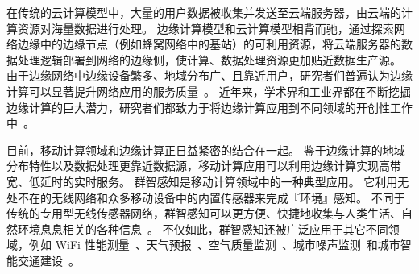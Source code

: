 在传统的云计算模型中，大量的用户数据被收集并发送至云端服务器，由云端的计算资源对海量数据进行处理。
边缘计算模型和云计算模型相背而驰，通过探索网络边缘中的边缘节点（例如蜂窝网络中的基站）的可利用资源，将云端服务器的数据处理逻辑部署到网络的边缘侧，使计算、数据处理资源更加贴近数据生产源。
由于边缘网络中边缘设备繁多、地域分布广、且靠近用户，研究者们普遍认为边缘计算可以显著提升网络应用的服务质量~\cite{DBLP:conf/sigcomm/BonomiMZA12}。
近年来，学术界和工业界都在不断挖掘边缘计算的巨大潜力，研究者们都致力于将边缘计算应用到不同领域的开创性工作中~\cite{DBLP:journals/access/MarjanovicAZ18,DBLP:journals/iotj/ChiangZ16}。


目前，移动计算领域和边缘计算正日益紧密的结合在一起。
鉴于边缘计算的地域分布特性以及数据处理更靠近数据源，移动计算应用可以利用边缘计算实现高带宽、低延时的实时服务。
群智感知是移动计算领域中的一种典型应用。
它利用无处不在的无线网络和众多移动设备中的内置传感器来完成『环境』感知。
不同于传统的专用型无线传感器网络，群智感知可以更方便、快捷地收集与人类生活、自然环境息息相关的各种信息~\cite{DBLP:journals/cm/GuoCZYC16}。
不仅如此，群智感知还被广泛应用于其它不同领域，例如 WiFi 性能测量~\cite{DBLP:journals/cm/RosenLLCMB14}、天气预报~\cite{DBLP:journals/tpds/ZhaoMTL15}、空气质量监测~\cite{DBLP:conf/huc/ZhangXWC14}、城市噪声监测~\cite{DBLP:conf/huc/ZhengLWZLC14}和城市智能交通建设~\cite{DBLP:conf/icdcs/ZhouJL15}。



